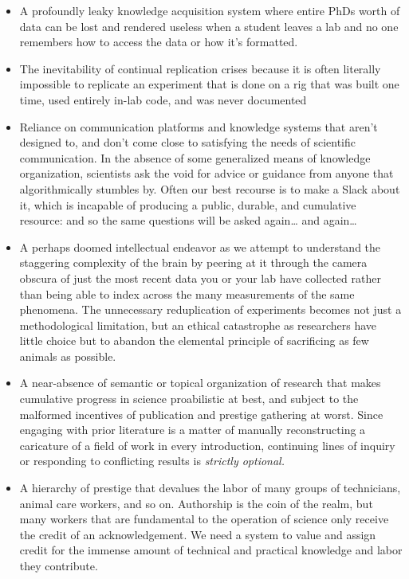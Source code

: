 \begin{itemize}

\item
  A profoundly leaky knowledge acquisition system where entire PhDs
  worth of data can be lost and rendered useless when a student leaves a
  lab and no one remembers how to access the data or how it's formatted.
\item
  The inevitability of continual replication crises because it is often
  literally impossible to replicate an experiment that is done on a rig
  that was built one time, used entirely in-lab code, and was never
  documented
\item
  Reliance on communication platforms and knowledge systems that aren't
  designed to, and don't come close to satisfying the needs of
  scientific communication. In the absence of some generalized means of
  knowledge organization, scientists ask the void
  for advice or guidance from anyone that algorithmically stumbles by.
  Often our best recourse is to make a Slack about it, which is
  incapable of producing a public, durable, and cumulative resource: and
  so the same questions will be asked again\ldots{} and again\ldots{}
\item
  A perhaps doomed intellectual endeavor as we attempt to understand the staggering
  complexity of the brain by peering at it through the camera obscura of
  just the most recent data you or your lab have collected rather than
  being able to index across the many measurements of the same
  phenomena. The unnecessary reduplication of experiments becomes not
  just a methodological limitation, but an ethical catastrophe as
  researchers have little choice but to abandon the elemental principle
  of sacrificing as few animals as possible.
\item
  A near-absence of semantic or topical organization of research that
  makes cumulative progress in science proabilistic at best, and subject
  to the malformed incentives of publication and prestige gathering at
  worst. Since engaging with prior literature is a matter of manually
  reconstructing a caricature of a field of work in every introduction,
  continuing lines of inquiry or responding to conflicting results is
  \emph{strictly optional.}
\item
  A hierarchy of prestige that devalues the labor of many groups of
  technicians, animal care workers, and so on. Authorship is the coin of
  the realm, but many workers that are fundamental to the operation of
  science only receive the credit of an acknowledgement. We need a
  system to value and assign credit for the immense amount of technical
  and practical knowledge and labor they contribute.
\end{itemize}

